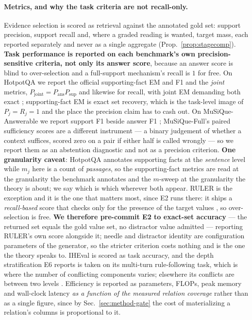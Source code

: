 \documentclass{article}
\begin{document}
\paragraph{Metrics, and why the task criteria are not recall-only.} Evidence selection is
scored as retrieval against the annotated gold set: support precision, support recall and, where
a graded reading is wanted, target mass, each reported separately and never as a single aggregate
(Prop.~\ref{prop:stagecomp}). \textbf{Task performance is reported on each benchmark's own
precision-sensitive criteria, not only its answer score}, because an answer score is blind to
over-selection and a full-support mechanism's recall is $1$ for free. On HotpotQA we report the
official supporting-fact EM and F1 and the \emph{joint} metrics, $P_{\mathrm{joint}} =
P_{\mathrm{ans}}P_{\mathrm{sup}}$ and likewise for recall, with joint EM demanding both exact
\citep{yang2018hotpotqa}; supporting-fact EM is exact set recovery, which is the task-level image
of $P_j=R_j=1$ and the place the precision claim has to cash out. On MuSiQue-Answerable we report support F1
beside answer F1 \citep{trivedi2022musique}; MuSiQue-Full's paired sufficiency scores are a
different instrument --- a binary judgement of whether a context suffices, scored zero on a pair
if either half is called wrongly --- so we report them as an abstention diagnostic and not as a
precision criterion. \textbf{One granularity caveat}: HotpotQA annotates supporting facts at the
\emph{sentence} level while $m_j$ here is a count of \emph{passages}, so the supporting-fact
metrics are read at the granularity the benchmark annotates and the $m$-sweep at the granularity
the theory is about; we say which is which wherever both appear. RULER is
the exception and it is the one that matters most, since E2 runs there: it ships a
\emph{recall-based} score that checks only for the presence of the target values
\citep{hsieh2024ruler}, so over-selection is free. \textbf{We therefore pre-commit E2 to
exact-set accuracy} --- the returned set equals the gold value set, no distractor value admitted
--- reporting RULER's own score alongside it; needle and distractor identity are configuration
parameters of the generator, so the stricter criterion costs nothing and is the one the theory
speaks to. IHEval is scored as task accuracy, and the depth stratification E6 reports is taken on its
multi-turn rule-following task, which is where the number of conflicting components varies;
elsewhere its conflicts are between two levels \citep{zhang2025iheval}.
Efficiency is reported as parameters, FLOPs, peak memory and wall-clock latency \emph{as a
function of the measured relation coverage} rather than as a single figure, since by
Sec.~\ref{sec:method-gate} the cost of materializing a relation's columns is proportional to it.
\end{document}
